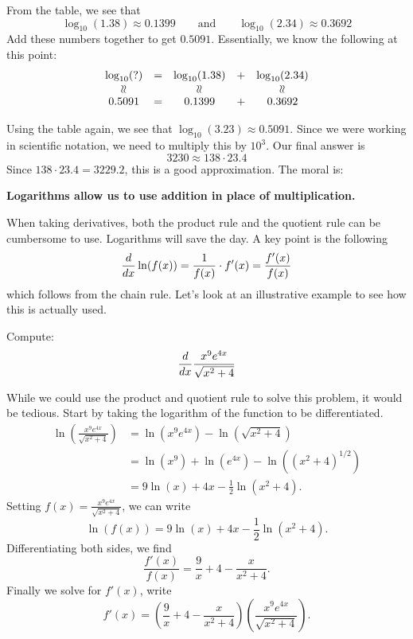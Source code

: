 From the table, we see that 
\[
\log_{10}(1.38) \approx 0.1399\qquad\text{and}\qquad \log_{10}(2.34)\approx 0.3692
\]
Add these numbers together to get $0.5091$. Essentially, we know the
following at this point:
\[
\begin{array}{ccccc}
\log_{10}(\text{?}) & = & \log_{10}(1.38) & + & \log_{10}(2.34)\\
  \rotatebox[origin=c]{90}{$\approx$}  & & \rotatebox[origin=c]{90}{$\approx$}   & & \rotatebox[origin=c]{90}{$\approx$}  \\
0.5091 & = & 0.1399 & + & 0.3692
\end{array}
\]



Using the table again, we see that $\log_{10}(3.23)\approx
0.5091$. Since we were working in scientific notation, we need to
multiply this by $10^3$. Our final answer is
\[
3230 \approx 138\cdot 23.4
\]
Since $138\cdot 23.4 = 3229.2$, this is a good approximation. The moral is:
\begin{center}
\textbf{Logarithms allow us to use addition in place of multiplication.}
\end{center}

When taking derivatives, both the product rule and the quotient rule
can be cumbersome to use. Logarithms will save the day. A key point is the following
\[
\frac{d}{dx} \ln(f(x)) = \frac{1}{f(x)}\cdot f'(x) = \frac{f'(x)}{f(x)}
\]
which follows from the chain rule. Let's look at an illustrative
example to see how this is actually used.

\begin{example} 
Compute:
\[
\frac{d}{dx} \frac{x^9e^{4x}}{\sqrt{x^2+4}}
\]
\end{example}
\begin{solution}
While we could use the product and quotient rule to solve this
problem, it would be tedious. Start by taking the logarithm of the
function to be differentiated.
\begin{align*}
\ln\left(\frac{x^9e^{4x}}{\sqrt{x^2+4}} \right) &= \ln\left(x^9e^{4x}\right) - \ln\left(\sqrt{x^2+4}\right)\\
&= \ln\left(x^9\right)+\ln\left(e^{4x}\right) - \ln\left((x^2+4)^{1/2}\right)\\
&= 9\ln(x)+4x - \frac{1}{2}\ln(x^2+4).
\end{align*}
Setting $f(x) = \frac{x^9e^{4x}}{\sqrt{x^2+4}}$, we can write
\[
\ln(f(x)) = 9\ln(x)+4x - \frac{1}{2}\ln(x^2+4).
\]
Differentiating both sides, we find
\[
\frac{f'(x)}{f(x)} = \frac{9}{x}+4 - \frac{x}{x^2+4}.
\]
Finally we solve for $f'(x)$, write
\[
f'(x) = \left(\frac{9}{x}+4 - \frac{x}{x^2+4}\right)\left(\frac{x^9e^{4x}}{\sqrt{x^2+4}}\right).
\]
\end{solution}

